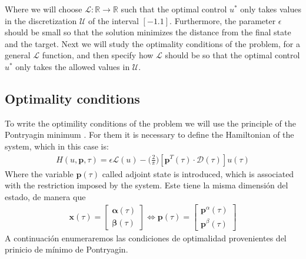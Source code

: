 Where we will choose $ \mathcal {L}: \mathbb {R} \rightarrow \mathbb {R} $ such that the optimal control $ u^* $ only takes values in the discretization $ \mathcal {U} $ of the interval $ [- 1.1] $. Furthermore, the parameter $ \epsilon $ should be small so that the solution minimizes the distance from the final state and the target.
%
Next we will study the optimality conditions of the problem, for a general $ \mathcal {L} $ function, and then specify how $ \mathcal {L} $ should be so that the optimal control $ u ^ * $ only takes the allowed values in $ \mathcal {U} $.

\subsection{Optimality conditions}

To write the optimility conditions of the problem we will use the principle of the Pontryagin minimum \cite[Chapter~2.7]{bryson1975applied}. For them it is necessary to define the Hamiltonian of the system, which in this case is:
\begin{gather}\label{hamil}
    H(u,\bm{p},\tau) = 
    \epsilon \mathcal{L}(u) -
    \bigg(\frac{2}{\pi}\bigg)[\bm{p}^T(\tau) \cdot \bm{\mathcal{D}}(\tau)]
    u(\tau)
\end{gather}
Where the variable $ \bm{p} (\tau) $ called adjoint state is introduced, which is associated with the restriction imposed by the system. Este tiene la misma dimensión del estado, de manera que 
\begin{gather}
        \bm{x}(\tau) = \begin{bmatrix}
            \bm{\alpha}(\tau) \\  \bm{\beta}(\tau)
        \end{bmatrix}   \Leftrightarrow
        \bm{p}(\tau) = \begin{bmatrix}
        \bm{p}^\alpha(\tau) \\ \bm{p}^\beta(\tau)
                \end{bmatrix}
\end{gather}
A continuación enumeraremos las condiciones de optimalidad provenientes del prinicio de mínimo de Pontryagin.

